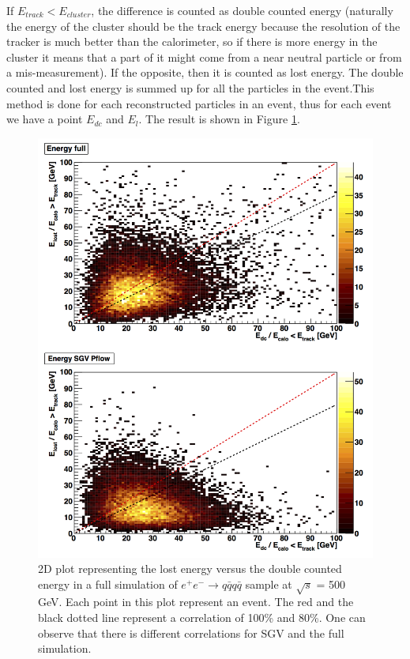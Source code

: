 \documentclass[a4paper,12pt]{article}
\begin{document}
If $E_{track} < E_{cluster}$, the difference is counted as double counted energy (naturally the energy of the cluster should be the track energy because the resolution of the tracker is much better than the calorimeter, so if there is more energy in the cluster it means that a part of it might come from a near neutral particle or from a mis-measurement). If the opposite, then it is counted as lost energy. The double counted and lost energy is summed up for all the particles in the event.This method is done for each reconstructed particles in an event, thus for each event we have a point $E_{dc}$ and $E_{l}$. The result is shown in Figure \ref{fig:cluster_track_level}.

\begin{figure}[!h]
   \centering
   \includegraphics[scale=0.4]{Correlation_nojet.png} 
      \caption{2D plot representing the lost energy versus the double counted energy in a full simulation of $e^+e^- \rightarrow q\bar{q} q\bar{q}$ sample at $\sqrt{s}$ = 500 GeV. Each point in this plot represent an event. The red and the black dotted line represent a correlation of 100\% and 80\%. One can observe that there is different correlations for SGV and the full simulation.}
   \label{fig:cluster_track_level}
\end{figure}
\end{document}
